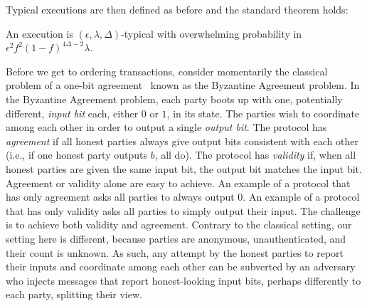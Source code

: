 Typical executions are then defined as before and the standard theorem holds:

\begin{theorem}
  An execution is $(\epsilon, \lambda, \Delta)$-typical with overwhelming
  probability in $\epsilon^2 f^2 (1 - f)^{4\Delta - 2} \lambda$.
\end{theorem}

Before we get to ordering transactions, consider momentarily the classical
problem of a one-bit agreement~\cite{lamport} known as the Byzantine
Agreement problem. In
the Byzantine Agreement problem, each party boots up with one, potentially
different, \emph{input bit} each, either $0$ or $1$, in its state. The parties
wish to coordinate among each other in order to output a single \emph{output
bit}. The protocol has \emph{agreement} if all honest parties always give output
bits consistent with each other (i.e., if one honest party outputs $b$, all do).
The protocol has \emph{validity} if, when all honest parties are given the same
input bit, the output bit matches the input bit. Agreement or validity alone are
easy to achieve. An example of a protocol that has only agreement asks
all parties to always output $0$. An example of a protocol that has only validity
asks all parties to simply output their input. The challenge is to achieve
both validity and agreement. Contrary to the classical setting, our setting here
is different, because parties are anonymous, unauthenticated, and their count is
unknown. As such, any attempt by the honest parties to report their inputs and
coordinate among each other can be subverted by an adversary who injects
messages that report honest-looking input bits, perhaps differently to each
party, splitting their view.

